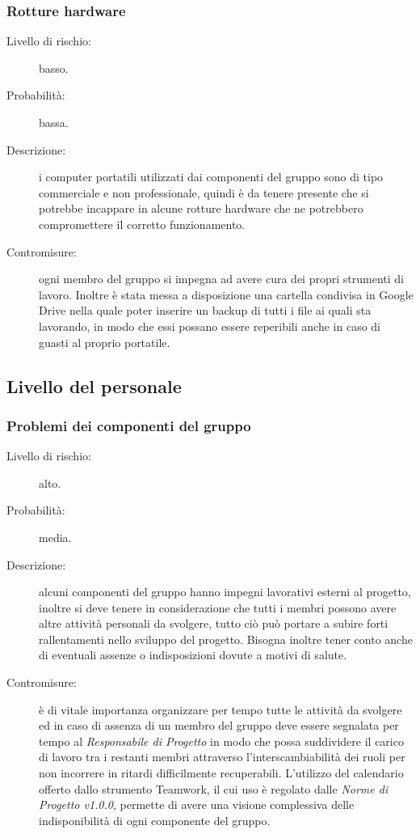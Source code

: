\subsubsection{Rotture hardware}
\begin{description}
	\item[Livello di rischio:] basso.
	\item[Probabilità:] bassa.
	\item[Descrizione:] i computer portatili utilizzati dai componenti del gruppo sono di tipo commerciale e non professionale, quindi è da tenere presente che si potrebbe incappare in alcune rotture hardware che ne potrebbero compromettere il corretto funzionamento.
	\item[Contromisure:] ogni membro del gruppo si impegna ad avere cura dei propri strumenti di lavoro. Inoltre è stata messa a disposizione una cartella condivisa in Google Drive nella quale poter inserire un backup di tutti i file ai quali sta lavorando, in modo che essi possano essere reperibili anche in caso di guasti al proprio portatile.
\end{description}

\subsection{Livello del personale}
\subsubsection{Problemi dei componenti del gruppo}
\begin{description}
	\item[Livello di rischio:] alto.
	\item[Probabilità:] media.
	\item[Descrizione:] alcuni componenti del gruppo hanno impegni lavorativi esterni al progetto, inoltre si deve tenere in considerazione che tutti i membri possono avere altre attività personali da svolgere, tutto ciò può portare a subire forti rallentamenti nello sviluppo del progetto. Bisogna inoltre tener conto anche di eventuali assenze o indisposizioni dovute a motivi di salute.
	\item[Contromisure:] è di vitale importanza organizzare per tempo tutte le attività da svolgere ed in caso di assenza di un membro del gruppo deve essere segnalata per tempo al \textit{Responsabile di Progetto} in modo che possa suddividere il carico di lavoro tra i restanti membri attraverso l'interscambiabilità dei ruoli per non incorrere in ritardi difficilmente recuperabili. L'utilizzo del calendario offerto dallo strumento Teamwork, il cui uso è regolato dalle \textit{Norme di Progetto v1.0.0}, permette di avere una visione complessiva delle indisponibilità di ogni componente del gruppo. 
\end{description}

